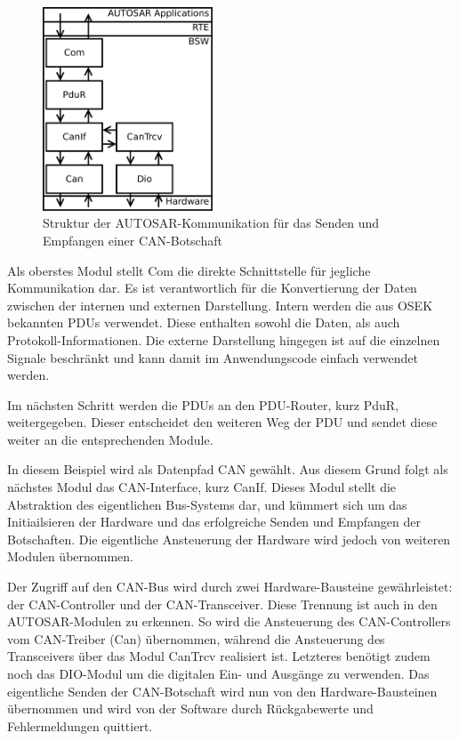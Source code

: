 \documentclass[
  a4paper,					    %
  twoside,
  DIV=calc,     				%
  bibliography=totoc,
  cleardoublepage=empty,
  ngerman,     					%
  final       					%
]{scrbook}
\begin{document}
\begin{figure}[ht]
    \centering
    \includegraphics[width=0.45\textwidth]{komm_beispiel}
    \caption[Struktur der AUTOSAR-Kommunikation]{Struktur der AUTOSAR-Kommunikation für das Senden und Empfangen einer CAN-Botschaft}
    \label{fig:komm_beispiel}
\end{figure}

Als oberstes Modul stellt Com die direkte Schnittstelle für jegliche Kommunikation dar. Es ist verantwortlich für die Konvertierung der Daten zwischen der internen und externen Darstellung. Intern werden die aus OSEK bekannten PDUs verwendet. Diese enthalten sowohl die Daten, als auch Protokoll-Informationen. Die externe Darstellung hingegen ist auf die einzelnen Signale beschränkt und kann damit im Anwendungscode einfach verwendet werden.

Im nächsten Schritt werden die PDUs an den PDU-Router, kurz PduR, weitergegeben. Dieser entscheidet den weiteren Weg der PDU und sendet diese weiter an die entsprechenden Module.

In diesem Beispiel wird als Datenpfad CAN gewählt. Aus diesem Grund folgt als nächstes Modul das CAN-Interface, kurz CanIf. Dieses Modul stellt die Abstraktion des eigentlichen Bus-Systems dar, und kümmert sich um das Initiailsieren der Hardware und das erfolgreiche Senden und Empfangen der Botschaften. Die eigentliche Ansteuerung der Hardware wird jedoch von weiteren Modulen übernommen.

Der Zugriff auf den CAN-Bus wird durch zwei Hardware-Bausteine gewährleistet: der CAN-Controller und der CAN-Transceiver. Diese Trennung ist auch in den AUTOSAR-Modulen zu erkennen. So wird die Ansteuerung des CAN-Controllers vom CAN-Treiber (Can) übernommen, während die Ansteuerung des Transceivers über das Modul CanTrcv realisiert ist. Letzteres benötigt zudem noch das DIO-Modul um die digitalen Ein- und Ausgänge zu verwenden. Das eigentliche Senden der CAN-Botschaft wird nun von den Hardware-Bausteinen übernommen und wird von der Software durch Rückgabewerte und Fehlermeldungen quittiert.
\end{document}
